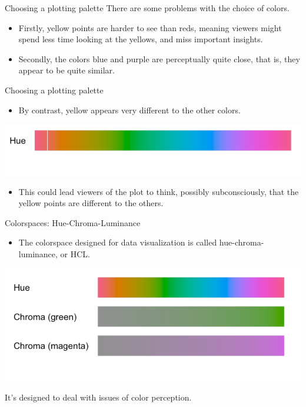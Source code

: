 \documentclass[
  ignorenonframetext,
]{beamer}
\providecommand{\tightlist}{%
  \setlength{\itemsep}{0pt}\setlength{\parskip}{0pt}}
\begin{document}
\begin{frame}{Choosing a plotting palette}
\label{choosing-a-plotting-palette-1}
There are some problems with the choice of colors.

\begin{itemize}
\item
  Firstly, yellow points are harder to see than reds, meaning viewers
  might spend less time looking at the yellows, and miss important
  insights.
\item
  Secondly, the colors blue and purple are perceptually quite close,
  that is, they appear to be quite similar.
\end{itemize}
\end{frame}

\begin{frame}{Choosing a plotting palette}
\label{choosing-a-plotting-palette-2}
\begin{itemize}
\tightlist
\item
  By contrast, yellow appears very different to the other colors.
\end{itemize}

\includegraphics{../images/im78.png}

\begin{itemize}
\tightlist
\item
  This could lead viewers of the plot to think, possibly subconsciously,
  that the yellow points are different to the others.
\end{itemize}
\end{frame}

\begin{frame}{Colorspaces: Hue-Chroma-Luminance}
\label{colorspaces-hue-chroma-luminance}
\begin{itemize}
\tightlist
\item
  The colorspace designed for data visualization is called
  hue-chroma-luminance, or HCL.
\end{itemize}

\includegraphics{../images/im79.png}

It's designed to deal with issues of color perception.
\end{frame}
\end{document}
